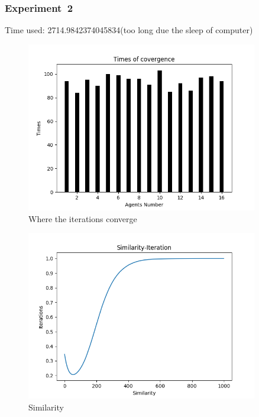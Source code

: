 \documentclass[a4paper,12pt]{article}
\begin{document}
     \subsubsection*{Experiment~2}
     Time used: 2714.9842374045834(too long due the sleep of computer)
    \begin{figure}[H]
    	\centering
    	\includegraphics[width=0.9\textwidth]{agt50_4_1000_1500_e2}
    	\caption{Where the iterations converge}\label{agt50_4_1000_1500_e2}
    \end{figure}
    \begin{figure}[H]
    	\centering
    	\includegraphics[width=0.9\textwidth]{Sim50_4_1000_1500_e2}
    	\caption{Similarity}\label{Sim50_4_1000_1500_e2}
    \end{figure}
\end{document}
